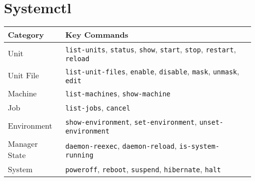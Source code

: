\documentclass[openany, 12pt]{book}
\begin{document}
\chapter{Systemctl}

\begin{center}
  \begin{tabular}{ll}
    \toprule
    Category      & Key Commands                                                                                                          \\
    \midrule
    Unit          & \texttt{list-units}, \texttt{status}, \texttt{show}, \texttt{start}, \texttt{stop}, \texttt{restart}, \texttt{reload} \\
    Unit File     & \texttt{list-unit-files}, \texttt{enable}, \texttt{disable}, \texttt{mask}, \texttt{unmask}, \texttt{edit}            \\
    Machine       & \texttt{list-machines}, \texttt{show-machine}                                                                         \\
    Job           & \texttt{list-jobs}, \texttt{cancel}                                                                                   \\
    Environment   & \texttt{show-environment}, \texttt{set-environment}, \texttt{unset-environment}                                       \\
    Manager State & \texttt{daemon-reexec}, \texttt{daemon-reload}, \texttt{is-system-running}                                            \\
    System        & \texttt{poweroff}, \texttt{reboot}, \texttt{suspend}, \texttt{hibernate}, \texttt{halt}                               \\
    \bottomrule
  \end{tabular}
\end{center}
\end{document}

